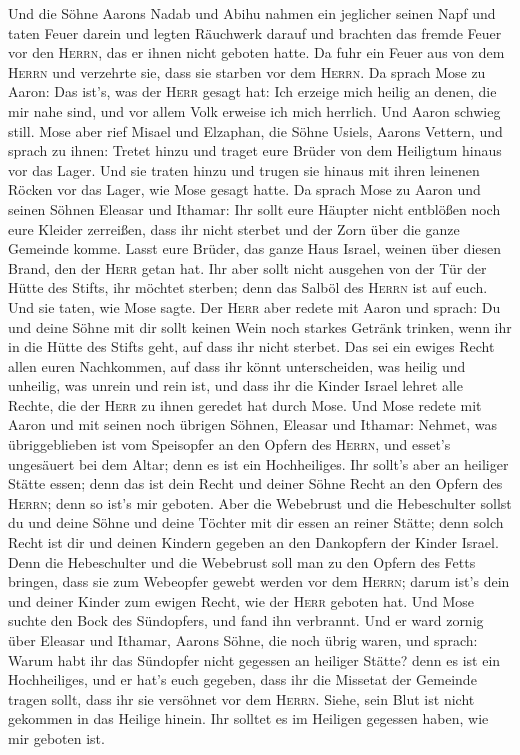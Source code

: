  Und die Söhne Aarons Nadab und Abihu nahmen ein jeglicher
seinen Napf und taten Feuer darein und legten Räuchwerk darauf und
brachten das fremde Feuer vor den \textsc{Herrn}, das er ihnen nicht
geboten hatte.  Da fuhr ein Feuer aus von dem
\textsc{Herrn} und verzehrte sie, dass sie starben vor dem
\textsc{Herrn}.  Da sprach Mose zu Aaron: Das ist's, was
der \textsc{Herr} gesagt hat: Ich erzeige mich heilig an denen, die mir
nahe sind, und vor allem Volk erweise ich mich herrlich. Und Aaron
schwieg still.  Mose aber rief Misael und Elzaphan, die
Söhne Usiels, Aarons Vettern, und sprach zu ihnen: Tretet hinzu und
traget eure Brüder von dem Heiligtum hinaus vor das Lager.
 Und sie traten hinzu und trugen sie hinaus mit ihren
leinenen Röcken vor das Lager, wie Mose gesagt hatte.  Da
sprach Mose zu Aaron und seinen Söhnen Eleasar und Ithamar: Ihr sollt
eure Häupter nicht entblößen noch eure Kleider zerreißen, dass ihr nicht
sterbet und der Zorn über die ganze Gemeinde komme. Lasst eure Brüder,
das ganze Haus Israel, weinen über diesen Brand, den der \textsc{Herr}
getan hat.  Ihr aber sollt nicht ausgehen von der Tür der
Hütte des Stifts, ihr möchtet sterben; denn das Salböl des
\textsc{Herrn} ist auf euch. Und sie taten, wie Mose sagte.
 Der \textsc{Herr} aber redete mit Aaron und sprach:
 Du und deine Söhne mit dir sollt keinen Wein noch starkes
Getränk trinken, wenn ihr in die Hütte des Stifts geht, auf dass ihr
nicht sterbet. Das sei ein ewiges Recht allen euren Nachkommen,
 auf dass ihr könnt unterscheiden, was heilig und
unheilig, was unrein und rein ist,  und dass ihr die
Kinder Israel lehret alle Rechte, die der \textsc{Herr} zu ihnen geredet
hat durch Mose.  Und Mose redete mit Aaron und mit seinen
noch übrigen Söhnen, Eleasar und Ithamar: Nehmet, was übriggeblieben ist
vom Speisopfer an den Opfern des \textsc{Herrn}, und esset's ungesäuert
bei dem Altar; denn es ist ein Hochheiliges.  Ihr sollt's
aber an heiliger Stätte essen; denn das ist dein Recht und deiner Söhne
Recht an den Opfern des \textsc{Herrn}; denn so ist's mir geboten.
 Aber die Webebrust und die Hebeschulter sollst du und
deine Söhne und deine Töchter mit dir essen an reiner Stätte; denn solch
Recht ist dir und deinen Kindern gegeben an den Dankopfern der Kinder
Israel.  Denn die Hebeschulter und die Webebrust soll man
zu den Opfern des Fetts bringen, dass sie zum Webeopfer gewebt werden
vor dem \textsc{Herrn}; darum ist's dein und deiner Kinder zum ewigen
Recht, wie der \textsc{Herr} geboten hat.  Und Mose
suchte den Bock des Sündopfers, und fand ihn verbrannt. Und er ward
zornig über Eleasar und Ithamar, Aarons Söhne, die noch übrig waren, und
sprach:  Warum habt ihr das Sündopfer nicht gegessen an
heiliger Stätte? denn es ist ein Hochheiliges, und er hat's euch
gegeben, dass ihr die Missetat der Gemeinde tragen sollt, dass ihr sie
versöhnet vor dem \textsc{Herrn}.  Siehe, sein Blut ist
nicht gekommen in das Heilige hinein. Ihr solltet es im Heiligen
gegessen haben, wie mir geboten ist.

